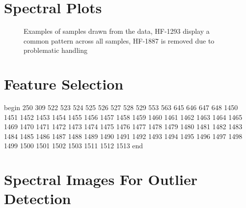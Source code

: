 \documentclass[a4paper, 12pt, oneside]{book}
\begin{document}
\begin{appendices}
\chapter{Spectral Plots}

\begin{figure}[h]
\label{appendix:spectraplot}
    \centering
    \qquad
    \caption{Examples of samples drawn from the data, HF-1293 display a common pattern across all samples, HF-1887 is removed due to problematic handling}%
\end{figure}

\chapter{Feature Selection}

\label{appendix:features0}
begin 250  309  522  523  524  525  526  527  528  529  553  563  645  646
  647  648 1450 1451 1452 1453 1454 1455 1456 1457 1458 1459 1460 1461
 1462 1463 1464 1465 1469 1470 1471 1472 1473 1474 1475 1476 1477 1478
 1479 1480 1481 1482 1483 1484 1485 1486 1487 1488 1489 1490 1491 1492
 1493 1494 1495 1496 1497 1498 1499 1500 1501 1502 1503 1511 1512 1513 end


\chapter{Spectral Images For Outlier Detection}

\end{appendices}
\end{document}
